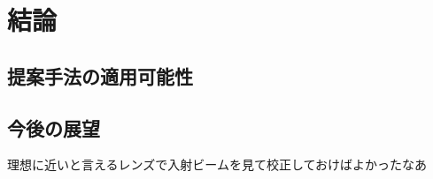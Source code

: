 \chapter{結論}
\thispagestyle{empty}
\label{chap6}
\graphicspath{{chap6/figure/}}
\minitoc

\newpage


\section{提案手法の適用可能性}
\label{chap6_conclusion}




\clearpage


\newpage

\section{今後の展望}
\label{chap6_futureworks}

理想に近いと言えるレンズで入射ビームを見て校正しておけばよかったなあ


\clearpage
\newpage


